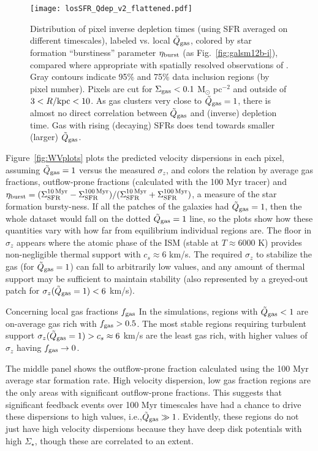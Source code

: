 \documentclass[usletter,fleqn,usenatbib]{mnras}
\begin{document}
\begin{figure}
	\centering
	\texttt{[image: losSFR\_Qdep\_v2\_flattened.pdf]}
	\caption{Distribution of pixel inverse depletion times (using SFR averaged on different timescales), labeled vs. local $\tilde Q_{\rm gas}$, colored by star formation ``burstiness'' parameter $\eta_{\rm burst}$ (as Fig.~\ref{fig:galsm12b-i}), compared where appropriate with spatially resolved observations of \citet{Leroy2008}.  Gray contours indicate 95\% and 75\% data inclusion regions (by pixel number).  Pixels are cut for $\Sigma_{\rm gas} < 0.1$ M$_\odot$ pc$^{-2}$ and outside of $3 < R/{\rm kpc} < 10$.  As gas clusters very close to $\tilde Q_{\rm gas}=1$, there is almost no direct correlation between $\tilde Q_{\rm gas}$ and (inverse) depletion time.  Gas with rising (decaying) SFRs does tend towards smaller (larger) $\tilde Q_{\rm gas}$. }\label{fig:Q-tdep}
\end{figure}
Figure~\ref{fig:WVplots} plots the predicted velocity dispersions in each pixel, assuming $\tilde Q_{\rm gas} = 1$ versus the measured $\sigma_z$, and colors the relation by average gas fractions, outflow-prone fractions (calculated with the 100 Myr tracer) and $\eta_{\rm burst} = (\Sigma_{\rm SFR}^{\rm 10 \, Myr}-\Sigma_{\rm SFR}^{\rm 100 \, Myr})/(\Sigma_{\rm SFR}^{\rm 10 \, Myr}+\Sigma_{\rm SFR}^{\rm 100\, Myr})$, a measure of the star formation bursty-ness.  If all the patches of the galaxies had $\tilde Q_{\rm gas} = 1$, then the whole dataset would fall on the dotted $\tilde Q_{\rm gas} = 1$ line, so the plots show how these quantities vary with how far from equilibrium individual regions are.  The floor in $\sigma_z$ appears where the atomic phase of the ISM (stable at $T \approx 6000$ K) provides non-negligible thermal support with $c_s \approx 6$ km/s.  The required $\sigma_z$ to stabilize the gas (for $\tilde Q_{\rm gas} = 1$) can fall to arbitrarily low values, and any amount of thermal support may be sufficient to maintain stability (also represented by a greyed-out patch for $\sigma_z(\tilde Q_{\rm gas} = 1) < 6$ km/s).

Concerning local gas fractions $f_{\rm gas}$ In the simulations, regions with $\tilde Q_{\rm gas} < 1$ are on-average gas rich with $f_{\rm gas} > 0.5$.  The most stable regions requiring turbulent support $\sigma_z(\tilde Q_{\rm gas} = 1) > c_s \approx 6$ km/s are the least gas rich, with higher values of $\sigma_z$ having $f_{\rm gas} \rightarrow 0$.

The middle panel shows the outflow-prone fraction calculated using the 100 Myr average star formation rate.  High velocity dispersion, low gas fraction regions are the only areas with significant outflow-prone fractions.  This suggests that significant feedback events over 100 Myr timescales have had a chance to drive these dispersions to high values, i.e.,$\tilde Q_{\rm gas} \gg 1$.  Evidently, these regions do not just have high velocity dispersions because they have deep disk potentials with high $\Sigma_\star$, though these are correlated to an extent.
\end{document}
